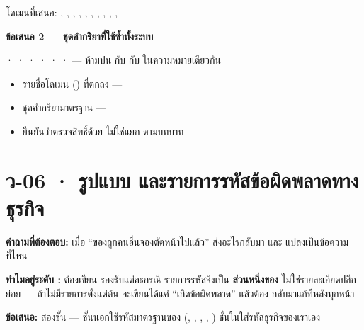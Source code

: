 โดเมนที่เสนอ: , , , ,
, , , ,
, , 

\textbf{ข้อเสนอ 2 --- ชุดคำกริยาที่ใช้ซ้ำทั้งระบบ}

 ·  ·  ·  ·  ·
 ·  --- ห้ามปน  กับ 
กับ  ในความหมายเดียวกัน

\begin{outbox}
\begin{itemize}
\item รายชื่อโดเมน () ที่ตกลง ---
\item ชุดคำกริยามาตรฐาน ---
\item ยืนยันว่าตรวจสิทธิ์ด้วย  ไม่ใช่แยก  ตามบทบาท
\end{itemize}
\end{outbox}

\section{ว-06 · รูปแบบ  และรายการรหัสข้อผิดพลาดทางธุรกิจ}

\textbf{คำถามที่ต้องตอบ:} เมื่อ ``ของถูกคนอื่นจองตัดหน้าไปแล้ว'' 
ส่งอะไรกลับมา และ  แปลงเป็นข้อความที่ไหน

\textbf{ทำไมอยู่ระดับ \pone{}:}  ต้องเขียน  รองรับแต่ละกรณี
รายการรหัสจึงเป็น \textbf{ส่วนหนึ่งของ } ไม่ใช่รายละเอียดปลีกย่อย ---
ถ้าไม่มีรายการตั้งแต่ต้น  จะเขียนได้แค่ ``เกิดข้อผิดพลาด'' แล้วต้อง
กลับมาแก้ทีหลังทุกหน้า

\textbf{ข้อเสนอ:} สองชั้น --- ชั้นนอกใช้รหัสมาตรฐานของ 
(, , , ,
) ชั้นในใส่รหัสธุรกิจของเราเอง

